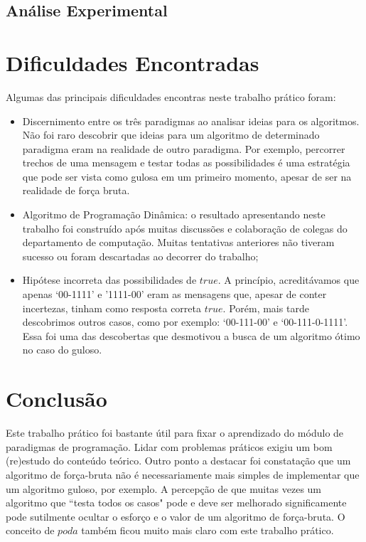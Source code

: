 \documentclass[a4paper,12pt,titlepage]{article}
\begin{document}
\subsection{Análise Experimental}


\section{Dificuldades Encontradas}

Algumas das principais dificuldades encontras neste trabalho prático foram: 
\begin{itemize}[leftmargin=1.5cm]
    \item Discernimento entre os três paradigmas ao analisar ideias para os algoritmos. Não foi raro descobrir que ideias para um algoritmo de determinado paradigma eram na realidade de outro paradigma. Por exemplo, percorrer trechos de uma mensagem e testar todas as possibilidades é uma estratégia que pode ser vista como gulosa em um primeiro momento, apesar de ser na realidade de força bruta.
    \item Algoritmo de Programação Dinâmica: o resultado apresentando neste trabalho foi construído após muitas discussões e colaboração de colegas do departamento de computação. Muitas tentativas anteriores não tiveram sucesso ou foram descartadas ao decorrer do trabalho;
    \item Hipótese incorreta das possibilidades de $true$. A princípio, acreditávamos que apenas `00-1111' e '1111-00' eram as mensagens que, apesar de conter incertezas, tinham como resposta correta $true$. Porém, mais tarde descobrimos outros casos, como por exemplo: `00-111-00' e `00-111-0-1111'. Essa foi uma das descobertas que desmotivou a busca de um algoritmo ótimo no caso do guloso.
    \ \\
\end{itemize}


\section{Conclusão}
Este trabalho prático foi bastante útil para fixar o aprendizado do módulo de paradigmas de programação. Lidar com problemas práticos exigiu um bom (re)estudo do conteúdo teórico. Outro ponto a destacar foi constatação que um algoritmo de força-bruta não é necessariamente mais simples de implementar que um algoritmo guloso, por exemplo. A percepção de que muitas vezes um algoritmo que ``testa todos os casos" pode e deve ser melhorado significamente pode sutilmente ocultar o esforço e o valor de um algoritmo de força-bruta. O conceito de $poda$ também ficou muito mais claro com este trabalho prático.
\end{document}
